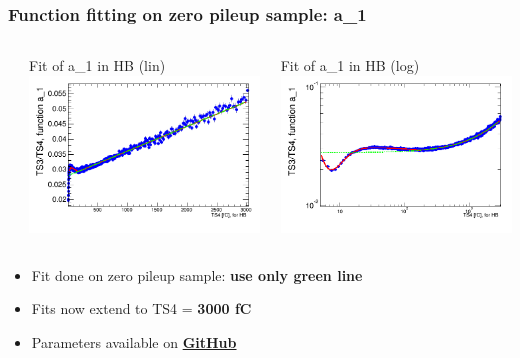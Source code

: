 \documentclass[bigger]{beamer}
\providecommand{\alert}[1]{\textbf{#1}}
\begin{document}
\begin{frame}
\frametitle{Function fitting on zero pileup sample: a\_1}
\label{sec-3-2-2}
\begin{columns} %
\label{sec-3-2-2-1}
\begin{column}{0.55\textwidth}
\label{sec-3-2-2-1-1}

\centering
Fit of a\_1 in HB (lin)
\includegraphics[width=\textwidth]{fig/a0_ring0_lin.png}
\end{column}
\begin{column}{0.55\textwidth}
\label{sec-3-2-2-1-2}

\centering
Fit of a\_1 in HB (log)
\includegraphics[width=\textwidth]{fig/a0_ring0_log.png}
\end{column}
\end{columns}
\label{sec-3-2-2-2}
\begin{itemize}

\item Fit done on zero pileup sample: \alert{use only green line}
\label{sec-3-2-2-2-1}%

\item Fits now extend to TS4 = \alert{3000 fC}
\label{sec-3-2-2-2-2}%

\item Parameters available on \href{https://github.com/edmundaberry/HcalReco/blob/master/analysis/src/fitResults.C}{\alert{GitHub}}
\label{sec-3-2-2-2-3}%
\end{itemize} %
\end{frame}
\end{document}
